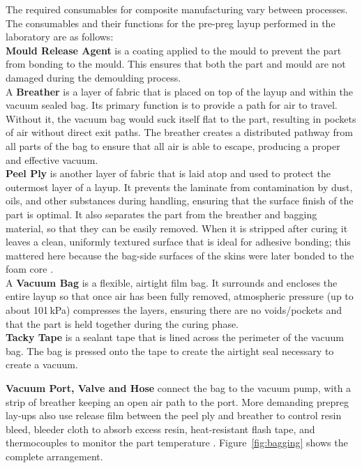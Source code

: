 \documentclass[11pt,a4paper]{article}
\newcommand{\added}[1]{\textcolor{addgreen}{#1}}
\newenvironment{addedblock}{\color{addgreen}}{}
\newcommand{\added}[1]{#1}
\newenvironment{addedblock}{}{}
\begin{document}
The required consumables for composite manufacturing \added{vary} between processes. The consumables and their functions for the pre-preg layup performed in the laboratory are as follows:\\

\textbf{\added{Mould} Release Agent} is a coating applied to the \added{mould} to prevent the part from bonding to the \added{mould}. This ensures that \added{both} the part and \added{mould} are not damaged during the \added{demoulding} process.\\

A \textbf{Breather} is a layer of fabric that is placed on top of the layup and within the vacuum sealed bag. Its primary function is to provide a path for air to travel. Without it, the vacuum bag would suck itself flat to the part, resulting in pockets of air without direct exit paths. The breather creates a distributed pathway from all parts of the bag to ensure that all air is able to escape, producing a proper and effective vacuum.\\

\textbf{Peel Ply} is another layer of fabric that is laid atop and used to protect the outermost layer of a layup. It prevents the laminate from contamination by dust, oils, and other substances during handling, ensuring that the surface finish of the part is optimal. It also separates the part from the breather and bagging material, so that they can be easily removed. \added{When it is stripped after curing it leaves a clean, uniformly textured surface that is ideal for adhesive bonding; this mattered here because the bag-side surfaces of the skins were later bonded to the foam core \citep{campbell2004}.}\\

A \textbf{Vacuum Bag} is a flexible, airtight film bag. It surrounds and encloses the entire layup so that once air has been fully removed, atmospheric pressure \added{(up to about 101\,kPa)} compresses the layers, ensuring there are no voids/pockets and that the part is held together during the curing phase.\\

\textbf{Tacky Tape} is a sealant tape that is lined across the perimeter of the vacuum bag. The bag is pressed onto the tape to create the airtight seal necessary to create a vacuum.

\begin{addedblock}
\vspace{\baselineskip}
\textbf{Vacuum Port, Valve and Hose} connect the bag to the vacuum
pump, with a strip of breather keeping an open air path to the port.
More demanding prepreg lay-ups also use release film between the peel
ply and breather to control resin bleed, bleeder cloth to absorb excess
resin, heat-resistant flash tape, and thermocouples to monitor the part
temperature \citep{hexcel2013,campbell2004}. Figure~\ref{fig:bagging}
shows the complete arrangement.
\end{addedblock}
\end{document}
